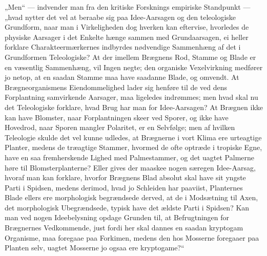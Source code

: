 \documentclass[11pt]{book}
\newcommand{\opage}[1]{\marginnote{\footnotesize\textit{[#1]}}}
\begin{document}
„Men“ --- indvender man fra den kritiske Forsknings empiriske Standpunkt ---
„hvad nytter det vel at beraabe sig paa Idee-Aarsagen og den teleologiske
Grundform, naar man
\opage{307} \setcounter{footnote}{0}%
i Virkeligheden dog hverken kan eftervise, hvorledes de physiske Aarsager i
det Enkelte hænge sammen med Grundaarsagen, ei heller forklare
Charakteermærkernes indbyrdes nødvendige Sammenhæng af det i Grundformen
Teleologiske? At der imellem Brægnens Rod, Stamme og Blade er en væsentlig
Sammenhæng, vil Ingen negte; den organiske Vexelvirkning medfører jo netop,
at en saadan Stamme maa have saadanne Blade, og omvendt. At
Brægneorganismens Eiendommelighed lader sig henføre til de ved dens
Forplantning samvirkende Aarsager, maa ligeledes indrømmes; men hvad skal nu
det Teleologiske forklare, hvad Brug har man for Idee-Aarsagen? At Brægnen
ikke kan have Blomster, naar Forplantningen skeer ved Sporer, og ikke have
Hovedrod, naar Sporen mangler Polaritet, er en Selvfølge; men af hvilken
Teleologie skulde det vel kunne udledes, at Brægnerne i vort Klima ere
urteagtige Planter, medens de træagtige Stammer, hvormed de ofte optræde i
tropiske Egne, have en saa fremherskende Lighed med Palmestammer, og det
uagtet Palmerne høre til Blomsterplanterne? Eller gives der maaskee nogen
særegen Idee-Aarsag, hvoraf man kan forklare, hvorfor Brægnens Blad absolut
skal have sit yngste Parti i Spidsen, medens derimod, hvad jo Schleiden har
paaviist, Planternes Blade ellers ere morphologisk begrændsede derved, at de
i Modsætning til Axen, det morphologisk Ubegrændsede, typisk have det ældste
Parti i Spidsen? Kan man ved nogen Ideebelysning opdage Grunden til, at
Befrugtningen for Brægnernes Vedkommende, just fordi her skal dannes en
saadan kryptogam Organisme, maa foregaae paa Forkimen, medens den hos
Mosserne foregaaer paa Planten selv, uagtet Mosserne jo ogsaa ere
kryptogame?“
\end{document}
